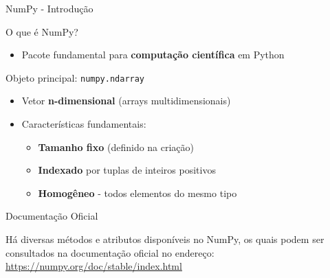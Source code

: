 \begin{frame}{NumPy - Introdução}

\begin{block}{O que é NumPy?}
\begin{itemize}
    \item Pacote fundamental para \textbf{computação científica} em Python
   
    
\end{itemize}
\end{block}

\begin{block}{Objeto principal: \texttt{numpy.ndarray}}
\begin{itemize}
    \item Vetor \textbf{n-dimensional} (arrays multidimensionais)
    \item Características fundamentais:
    \begin{itemize}
        \item \textbf{Tamanho fixo} (definido na criação)
        \item \textbf{Indexado} por tuplas de inteiros positivos
        \item \textbf{Homogêneo} - todos elementos do mesmo tipo
    \end{itemize}
\end{itemize}
\end{block}

\begin{exampleblock}{Documentação Oficial}
\centering

Há diversas métodos e atributos disponíveis no NumPy, os quais podem ser consultados na documentação oficial no endereço:
\url{https://numpy.org/doc/stable/index.html}


\end{exampleblock}


\end{frame}


